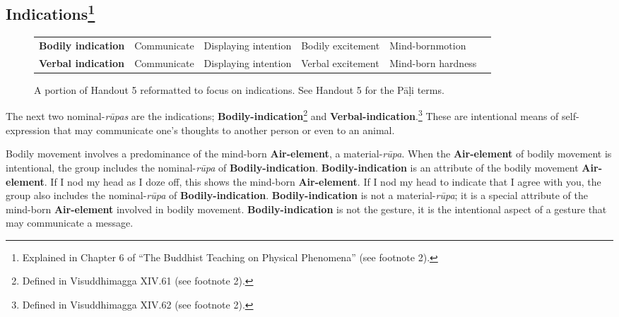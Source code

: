 \subsection*{Indications\footnote{Explained in Chapter 6 of “The Buddhist Teaching on Physical Phenomena” (see footnote 2).}}

\begin{figure} [H]
\setlength{\tabcolsep}{0pt}
\renewcommand{\arraystretch}{1.1}
\noindent\begin{tabular}{P{0.25\textwidth} | C{.185\textwidth} C{0.185\textwidth} C{0.185\textwidth} C{0.195\textwidth} m{0mm}}
\toprule
 &  &  &  & \\
\midrule
\textbf{Bodily indication} & Communicate & Displaying intention & Bodily excitement & Mind-born\newline motion &\\[9mm]
\textbf{Verbal indication} & Communicate & Displaying intention & Verbal excitement & Mind-born hardness &\\[9mm]
\bottomrule
\end{tabular}
\caption{A portion of Handout 5 reformatted to focus on indications. See Handout 5 for the Pāḷi terms.}
\end{figure}

The next two nominal-\textit{rūpas} are the indications; \textbf{Bodily-indication}\footnote{Defined in Visuddhimagga XIV.61 (see footnote 2).} and \textbf{Verbal-indication}.\footnote{Defined in Visuddhimagga XIV.62 (see footnote 2).} These are intentional means of self-expression that may communicate one’s thoughts to another person or even to an animal.

Bodily movement involves a predominance of the mind-born \textbf{Air-element}, a material-\textit{rūpa}. When the \textbf{Air-element} of bodily movement is intentional, the group includes the nominal-\textit{rūpa} of \textbf{Bodily-indication}. \textbf{Bodily-indication} is an attribute of the bodily movement \textbf{Air-element}. If I nod my head as I doze off, this shows the mind-born \textbf{Air-element}. If I nod my head to indicate that I agree with you, the group also includes the nominal-\textit{rūpa} of \textbf{Bodily-indication}. \textbf{Bodily-indication} is not a material-\textit{rūpa}; it is a special attribute of the mind-born \textbf{Air-element} involved in bodily movement. \textbf{Bodily-indication} is not the gesture, it is the intentional aspect of a gesture that may communicate a message.

